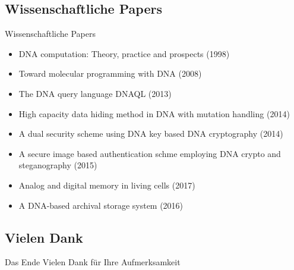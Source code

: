 \documentclass[aspectratio=1610]{beamer}
\begin{document}
\subsection{Wissenschaftliche Papers}
\label{sec:org67ba790}
\begin{frame}[label={sec:orgd408b33}]{Wissenschaftliche Papers}
\begin{itemize}
\item DNA computation: Theory, practice and prospects (1998)
\item Toward molecular programming with DNA (2008)
\item The DNA query language DNAQL (2013)
\item High capacity data hiding method in DNA with mutation handling (2014)
\item A dual security scheme using DNA key based DNA cryptography (2014)
\item A secure image based authentication schme employing DNA crypto and steganography (2015)
\item Analog and digital memory in living cells (2017)
\item A DNA-based archival storage system (2016)
\end{itemize}
\end{frame}

\subsection*{Vielen Dank}
\label{sec:org6cf500d}
\begin{frame}[label={sec:orgcc7bb64}]{Das Ende}
Vielen Dank für Ihre Aufmerksamkeit
\end{frame}
\end{document}
